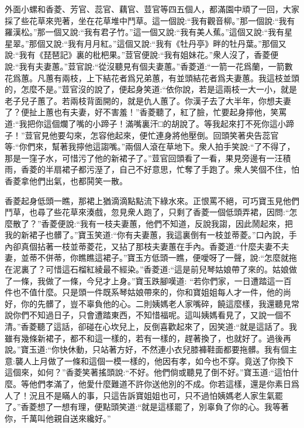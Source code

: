 \begin{parag}
    外面小螺和香菱、芳官、蕊官、藕官、荳官等四五個人，都滿園中頑了一回，大家採了些花草來兜著，坐在花草堆中鬥草。這一個說:“我有觀音柳。”那一個說:“我有羅漢松。”那一個又說:“我有君子竹。”這一個又說:“我有美人蕉。”這個又說:“我有星星翠。”那個又說:“我有月月紅。”這個又說:“我有《牡丹亭》畔的牡丹葉。”那個又說:“我有《琵琶記》裏的枇杷果。”荳官便說:“我有姐妹花。”衆人沒了，香菱便說:“我有夫妻蕙。”荳官說:“從沒聽見有個夫妻蕙。”香菱道:“一箭一花爲蘭，一箭數花爲蕙。凡蕙有兩枝，上下結花者爲兄弟蕙，有並頭結花者爲夫妻蕙。我這枝並頭的，怎麼不是。”荳官沒的說了，便起身笑道:“依你說，若是這兩枝一大一小，就是老子兒子蕙了。若兩枝背面開的，就是仇人蕙了。你漢子去了大半年，你想夫妻了？便扯上蕙也有夫妻，好不害羞！”香菱聽了，紅了臉，忙要起身擰他，笑罵道:“我把你這個爛了嘴的小蹄子！滿嘴裏汗□的胡說了。等我起來打不死你這小蹄子！”荳官見他要勾來，怎容他起來，便忙連身將他壓倒。回頭笑著央告蕊官等:“你們來，幫著我擰他這謅嘴。”兩個人滾在草地下。衆人拍手笑說:“了不得了，那是一窪子水，可惜污了他的新裙子了。”荳官回頭看了一看，果見旁邊有一汪積雨，香菱的半扇裙子都污溼了，自己不好意思，忙奪了手跑了。衆人笑個不住，怕香菱拿他們出氣，也都鬨笑一散。
\end{parag}


\begin{parag}
    香菱起身低頭一瞧，那裙上猶滴滴點點流下綠水來。正恨罵不絕，可巧寶玉見他們鬥草，也尋了些花草來湊戲，忽見衆人跑了，只剩了香菱一個低頭弄裙，因問:“怎麼散了？”香菱便說:“我有一枝夫妻蕙，他們不知道，反說我謅，因此鬧起來，把我的新裙子也髒了。”寶玉笑道:“你有夫妻蕙，我這裏倒有一枝並蒂菱。”口內說，手內卻真個拈著一枝並蒂菱花，又拈了那枝夫妻蕙在手內。香菱道:“什麼夫妻不夫妻，並蒂不併蒂，你瞧瞧這裙子。”寶玉方低頭一瞧，便噯呀了一聲，說:“怎麼就拖在泥裏了？可惜這石榴紅綾最不經染。”香菱道:“這是前兒琴姑娘帶了來的。姑娘做了一條，我做了一條，今兒才上身。”寶玉跌腳嘆道: “若你們家，一日遭踏這一百件也不值什麼。只是頭一件既系琴姑娘帶來的，你和寶姐姐每人才一件，他的尚好，你的先髒了，豈不辜負他的心。二則姨媽老人家嘴碎，饒這麼樣，我還聽見常說你們不知過日子，只會遭踏東西，不知惜福呢。這叫姨媽看見了，又說一個不清。”香菱聽了這話，卻碰在心坎兒上，反倒喜歡起來了，因笑道:“就是這話了。我雖有幾條新裙子，都不和這一樣的，若有一樣的，趕著換了，也就好了。過後再說。”寶玉道:“你快休動，只站著方好，不然連小衣兒膝褲鞋面都要拖髒。我有個主意:襲人上月做了一條和這個一模一樣的，他因有孝，如今也不穿。竟送了你換下這個來，如何？”香菱笑著搖頭說:“不好。他們倘或聽見了倒不好。”寶玉道:“這怕什麼。等他們孝滿了，他愛什麼難道不許你送他別的不成。你若這樣，還是你素日爲人了！況且不是瞞人的事，只這告訴寶姐姐也可，只不過怕姨媽老人家生氣罷了。”香菱想了一想有理，便點頭笑道:“就是這樣罷了，別辜負了你的心。我等著你，千萬叫他親自送來纔好。”
\end{parag}


